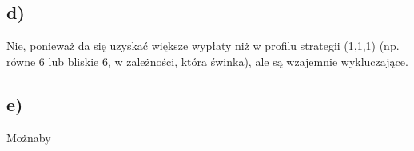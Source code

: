 \documentclass{article}
\begin{document}
\subsection*{d)}

Nie, ponieważ da się uzyskać większe wypłaty niż w profilu strategii (1,1,1) (np. równe 6 lub bliskie 6, w zależności, która świnka), ale są wzajemnie wykluczające.

\subsection*{e)}

Możnaby 
\end{document}
